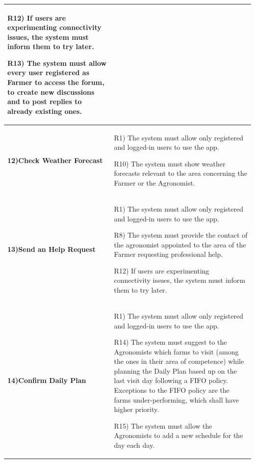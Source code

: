 \documentclass[table, 12pt]{article}
\begin{document}
\begin{itemize}
\begin{longtable}{|p{}|p{}|}
                                                                               R12) If users are experimenting connectivity issues, the system must inform them to try later.
                                                                               
                                                                               R13) The system must allow every user registered as Farmer to access the forum, to create new discussions and to post replies to already existing ones.\\\hline
                    \cellcolor{SpringGreen!50}\textbf{12)Check Weather Forecast}\centering &  R1) The system must allow only registered and logged-in users to use the app.
                    
                                                                                    R10) The system must show weather forecasts relevant to the area concerning the Farmer or the Agronomist.\\\hline
                    \cellcolor{SpringGreen!50}\textbf{13)Send an Help Request}\centering &  R1) The system must allow only registered and logged-in users to use the app.
                    
                                                                                  R8) The system must provide the contact of the agronomist appointed to the area of the Farmer requesting professional help.
                                                                                  
                                                                                  R12) If users are experimenting connectivity issues, the system must inform them to try later.\\\hline
                    \cellcolor{SpringGreen!50}\textbf{14)Confirm Daily Plan}\centering &  R1) The system must allow only registered and logged-in users to use the app.
                    
                                                                                          R14) The system must suggest to the Agronomists which farms to visit (among the ones in their area of competence) while planning the Daily Plan based up on the last visit day following a FIFO policy. Exceptions to the FIFO policy are the farms under-performing, which shall have higher priority.

                                                                                          R15) The system must allow the Agronomists to add a new schedule for the day each day.
                                                                                        

\end{longtable}
\end{itemize}
\end{document}
